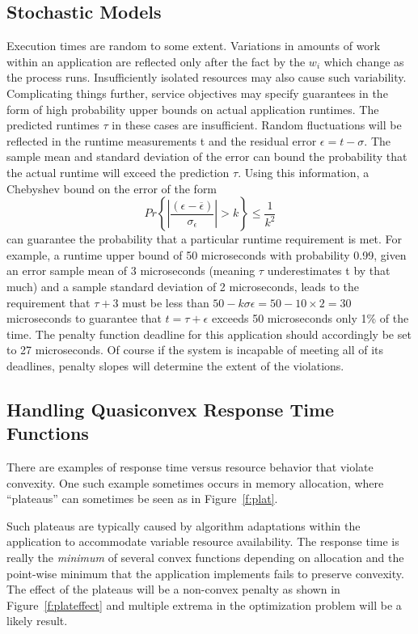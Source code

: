 \subsection{Stochastic Models}
Execution times are random to some extent. Variations in amounts of work within an application are reflected only after the fact by the $w_i$ which change as the process runs.  Insufficiently isolated resources may also cause such variability. Complicating things further, service objectives may specify guarantees in the form of high probability upper bounds on actual application runtimes.  The predicted runtimes $\tau$ in these cases are insufficient.
Random fluctuations will be reflected in the runtime measurements t and the residual error $\epsilon = t - \sigma$. The sample mean and standard deviation of the error can bound the probability that the actual runtime will exceed the prediction $\tau$. Using this information, a Chebyshev bound on the error of the form
\begin{equation}
Pr\left\{\left|\frac{(\epsilon-\overline{\epsilon})}{\sigma_\epsilon}\right| > k\right\}\leq\frac{1}{k^2} 
\end{equation}
can guarantee the probability that a particular runtime requirement is met.
For example, a runtime upper bound of 50 microseconds with probability 0.99, given an error sample mean of 3 microseconds (meaning $\tau$ underestimates t by that much) and a sample standard deviation of 2 microseconds, leads to the requirement that $\tau + 3$ must be less than $50 - k \sigma\epsilon = 50 - 10\times2 = 30$ microseconds to guarantee that $t = \tau  + \epsilon$ exceeds 50 microseconds only 1\% of the time.  The penalty function deadline for this application should accordingly be set to 27 microseconds.  Of course if the system is incapable of meeting all of its deadlines, penalty slopes will determine the extent of the violations.




\subsection{Handling Quasiconvex Response Time Functions}

There are examples of response time versus resource behavior that violate convexity.  One such example sometimes occurs in memory allocation, where ``plateaus'' can sometimes be seen as in Figure~\ref{f:plat}.

Such plateaus are typically caused by algorithm adaptations within the application to accommodate variable resource availability.  The response time is really the \emph{minimum} of several convex functions depending on allocation and the point-wise minimum that the application implements fails to preserve convexity.  The effect of the plateaus will be a non-convex penalty as shown in Figure~\ref{f:plateffect} and multiple extrema in the optimization problem will be a likely result.

